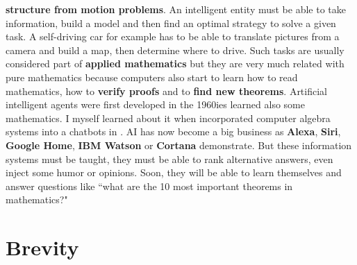 \documentclass[12pt]{amsart}
\newcounter{example}    \def\example#1{ \item \fontsize{12}{15} \selectfont #1 \fontsize{12}{15} \selectfont }
\begin{document}
{\bf structure from motion problems}. An intelligent entity must be able to take information, build
a model and then find an optimal strategy to solve a given task. A self-driving car for example has
to be able to translate pictures from a camera and build a map, then determine where to drive.
Such tasks are usually considered part of {\bf applied mathematics} but they are 
very much related with pure mathematics because computers also start to learn how to read mathematics, 
how to {\bf verify proofs} and to {\bf find new theorems}. 
Artificial intelligent agents \cite{Wei65} were first developed in the 1960ies learned also some mathematics. 
I myself learned about it when incorporated computer algebra systems into a chatbots in \cite{AIEducation}. 
AI has now become a big business as {\bf Alexa}, {\bf Siri}, {\bf Google Home}, {\bf IBM Watson} or {\bf Cortana} 
demonstrate. But these information systems must be taught, they must be able to rank alternative answers,
even inject some humor or opinions. Soon, they will be able to learn themselves and 
answer questions like ``what are the 10 most important theorems in mathematics?"

\section*{Brevity}
\end{document}
